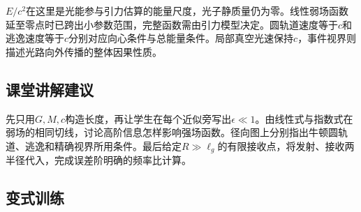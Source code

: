 \documentclass[UTF8,fontset=fandol,a4paper,11pt]{ctexart}
\begin{document}
$E/c^2$在这里是光能参与引力估算的能量尺度，光子静质量仍为零。线性弱场函数延至零点时已跨出小参数范围，完整函数需由引力模型决定。圆轨道速度等于$c$和逃逸速度等于$c$分别对应向心条件与总能量条件。局部真空光速保持$c$，事件视界则描述光路向外传播的整体因果性质。



\subsection*{课堂讲解建议}

先只用$G,M,c$构造长度，再让学生在每个近似旁写出$\epsilon\ll1$。由线性式与指数式在弱场的相同切线，讨论高阶信息怎样影响强场函数。径向图上分别指出牛顿圆轨道、逃逸和精确视界所用条件。最后给定$R\gg\ell_g$的有限接收点，将发射、接收两半径代入，完成误差阶明确的频率比计算。



\subsection*{变式训练}
\end{document}
